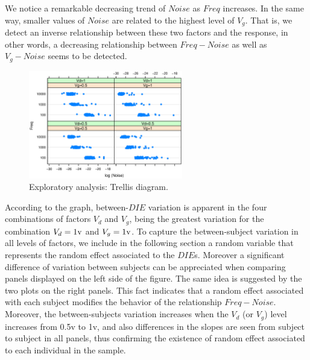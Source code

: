 \documentclass[sn-mathphys]{sn-jnl}%
\theoremstyle{thmstyleone}%
\theoremstyle{thmstyletwo}%
\theoremstyle{thmstylethree}%
\begin{document}
We notice a remarkable decreasing trend of $Noise$ as $Freq$ increases. In the same way, smaller values of $Noise$ are related to the highest level of $V_g$. That is, we detect an inverse relationship between these two factors and the response, in other words, a decreasing relationship between $Freq-Noise$ as well as $V_g-Noise$ seems to be detected. 
\begin{figure}[ht]
	\centerline{
		\includegraphics[width=0.6\textwidth]{Fig2_trellis2.eps}}
	\caption{Exploratory analysis: Trellis diagram. }
	\label{fig:trellis2}
\end{figure}


According to the graph, between-$DIE$ variation is apparent in the four combinations of factors $V_d$ and $V_g$, being the greatest variation for the combination $V_d=1 \rm{v}$ and $V_g=1 \rm{v}$. To capture the between-subject variation in all levels of factors, we include in the following section a random variable that represents the random effect associated to the $DIE$s.
Moreover a significant difference of variation between subjects can be appreciated when comparing panels displayed on the left side of the figure. The same idea is suggested by the two plots on the right panels. This fact indicates that a random effect associated with each subject modifies the behavior of the relationship $Freq-Noise$. Moreover, the between-subjects variation increases when the $V_d$ (or $V_g$) level increases from 0.5\rm{v} to 1\rm{v}, and also differences in the slopes are seen from subject to subject in all panels, thus confirming the existence of random effect associated to each individual in the sample.
\end{document}
